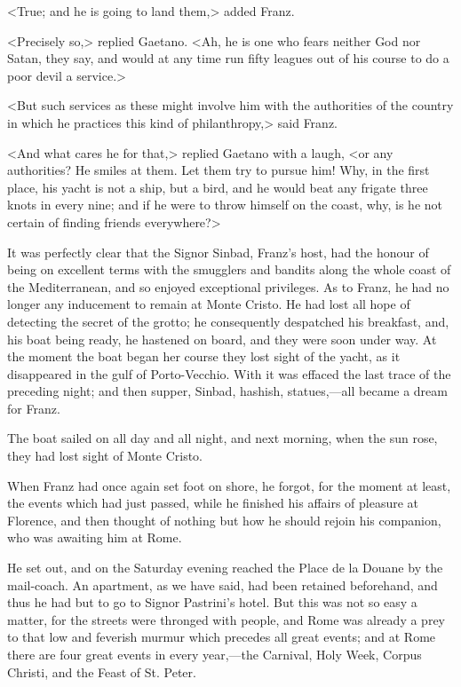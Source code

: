  <True; and he is going to land them,> added Franz. 

 <Precisely so,> replied Gaetano. <Ah, he is one who fears neither God nor Satan, they say, and would at any time run fifty leagues out of his course to do a poor devil a service.>

<But such services as these might involve him with the authorities of the country in which he practices this kind of philanthropy,> said Franz. 

 <And what cares he for that,> replied Gaetano with a laugh, <or any authorities? He smiles at them. Let them try to pursue him! Why, in the first place, his yacht is not a ship, but a bird, and he would beat any frigate three knots in every nine; and if he were to throw himself on the coast, why, is he not certain of finding friends everywhere?> 

 It was perfectly clear that the Signor Sinbad, Franz's host, had the honour of being on excellent terms with the smugglers and bandits along the whole coast of the Mediterranean, and so enjoyed exceptional privileges. As to Franz, he had no longer any inducement to remain at Monte Cristo. He had lost all hope of detecting the secret of the grotto; he consequently despatched his breakfast, and, his boat being ready, he hastened on board, and they were soon under way. At the moment the boat began her course they lost sight of the yacht, as it disappeared in the gulf of Porto-Vecchio. With it was effaced the last trace of the preceding night; and then supper, Sinbad, hashish, statues,—all became a dream for Franz. 

 The boat sailed on all day and all night, and next morning, when the sun rose, they had lost sight of Monte Cristo. 

 When Franz had once again set foot on shore, he forgot, for the moment at least, the events which had just passed, while he finished his affairs of pleasure at Florence, and then thought of nothing but how he should rejoin his companion, who was awaiting him at Rome. 

 He set out, and on the Saturday evening reached the Place de la Douane by the mail-coach. An apartment, as we have said, had been retained beforehand, and thus he had but to go to Signor Pastrini's hotel. But this was not so easy a matter, for the streets were thronged with people, and Rome was already a prey to that low and feverish murmur which precedes all great events; and at Rome there are four great events in every year,—the Carnival, Holy Week, Corpus Christi, and the Feast of St. Peter. 

